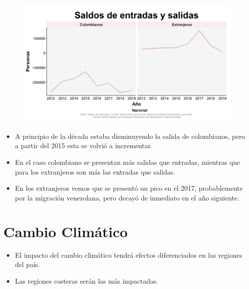     \begin{figure}[H]
        \caption[Saldos de entradas y salidas a nivel nacional de colombianos y extranjeros ]{\label{saldos_nacionalidad} }
        \begin{center}
        \includegraphics[width=\textwidth,keepaspectratio]{img/var_237_trend.png}
        \end{center}
    \end{figure}
            \begin{itemize}
                    \item A principio de la década estaba disminuyendo la salida de colombianos, pero a partir del 2015 esta se volvió a incrementar.
                    \item En el caso colombiano se presentan más salidas que entradas, mientras que para los extranjeros son más las entradas que salidas.
                    \item En los extranjeros vemos que se presentó un pico en el 2017, probablemente por la migración venezolana, pero decayó de inmediato en el año siguiente.
                    \end{itemize}

\section{Cambio Climático}


    \begin{tcolorbox}[enhanced, colback=mycolor,colframe=mycolor,drop fuzzy shadow,watermark color=white,
                        title=Principales Resultados]
    
            \begin{itemize}
                    \item El impacto del cambio climático tendrá efectos diferenciados en las regiones del país.
                    \item Las regiones costeras serán las más impactadas.
            \end{itemize}
     
    \end{tcolorbox}
    

